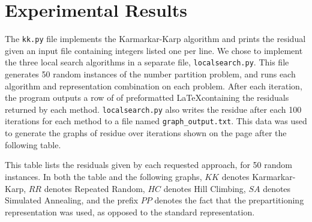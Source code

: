\documentclass[solution, letterpaper]{cs121}
\begin{document}
\section*{Experimental Results}
\hspace{4mm} The \texttt{kk.py} file implements the Karmarkar-Karp algorithm and prints the residual given an input file containing integers listed one per line. We chose to implement the three local search algorithms in a separate file, \texttt{localsearch.py}. This file generates 50 random instances of the number partition problem, and runs each algorithm and representation combination on each problem. After each iteration, the program outputs a row of of preformatted \LaTeX containing the residuals returned by each method. \texttt{localsearch.py} also writes the residue after each 100 iterations for each method to a file named \texttt{graph\_output.txt}. This data was used to generate the graphs of residue over iterations shown on the page after the following table.

This table lists the residuals given by each requested approach, for 50 random instances. In both the table and the following graphs, $KK$ denotes Karmarkar-Karp, $RR$ denotes Repeated Random, $HC$ denotes Hill Climbing, $SA$ denotes Simulated Annealing, and the prefix $PP$ denotes the fact that the prepartitioning representation was used, as opposed to the standard representation.
\end{document}
